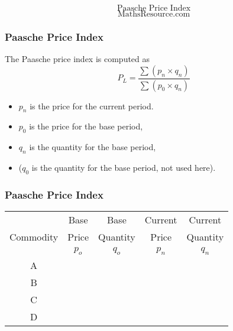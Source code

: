 \documentclass{beamer}
\begin{document}
\begin{frame}
\bigskip
{
\Huge
\[ \mbox{Paasche Price Index}\]
}
{
\Large
\[ \mbox{MathsResource.com}\]
}
\end{frame}



\begin{frame}
\frametitle{Paasche Price Index}

\LARGE

The Paasche price index is computed as
\[  P_L=\frac{\sum (p_{n}\times q_{n})}{\sum (p_{0}\times q_{n})}  \]

\begin{itemize}
\item  $p_n$ is the price for the current period.
\item  $p_0$ is the price for the base period,
\item  $q_n$ is the quantity for the base period,
\item  ($q_0$ is the quantity for the base period, not used here).
\end{itemize}
\end{frame}



\begin{frame}
\frametitle{Paasche Price Index}
\Large
\vspace{-1cm}
\begin{center}
\begin{tabular}{|c||c|c||c|c|}
\hline   & Base & Base & Current & Current    \\ 
  Commodity & Price & Quantity & Price & Quantity     \\ 
\hline \hline & $p_o$ & $q_o$ & $p_n$ & $q_n$    \\ 
\hline A &  &  & &  \\ 
\hline B &  &   &  &\\ 
\hline C &  &    &  &\\ 
\hline D &  &  &  &\\ \hline

\end{tabular} 
\end{center}

\end{frame}
\end{document}

